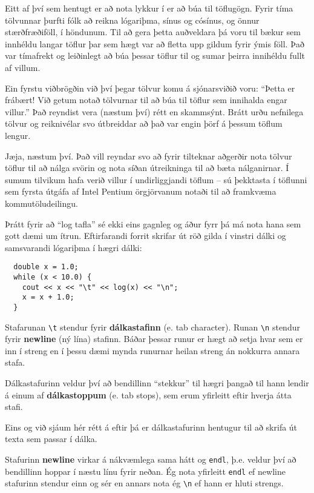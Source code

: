 Eitt af því sem hentugt er að nota lykkur í er að búa til töflugögn.
Fyrir tíma tölvunnar þurfti fólk að reikna lógariþma, sínus og cósínus, og önnur stærðfræðiföll, í höndunum.
Til að gera þetta auðveldara þá voru til bækur sem innhéldu langar töflur þar sem hægt var að fletta upp gildum fyrir ýmis föll.
Það var tímafrekt og leiðinlegt að búa þessar töflur til og sumar þeirra innihéldu fullt af villum.

Ein fyrstu viðbrögðin við því þegar tölvur komu á sjónarsviðið voru:
``Þetta er frábært!  Við getum notað tölvurnar til að búa til töflur sem innihalda engar villur.''
Það reyndist vera (næstum því) rétt en skammsýnt.
Brátt urðu nefnilega tölvur og reiknivélar svo útbreiddar að það var engin þörf á þessum töflum lengur.

Jæja, næstum því.
Það vill reyndar svo að fyrir tilteknar aðgerðir nota tölvur töflur til að nálga svörin og nota síðan útreikninga til að bæta nálganirnar.
Í sumum tilvikum hafa verið villur í undirliggjandi töflum -- sú þekktasta í töflunni sem fyrsta útgáfa af Intel Pentium örgjörvanum notaði til að framkvæma kommutöludeilingu.


Þrátt fyrir að ``log tafla'' sé ekki eins gagnleg og áður fyrr þá má nota hana sem gott dæmi um ítrun.
Eftirfarandi forrit skrifar út röð gilda í vinstri dálki og samsvarandi lógariþma í hægri dálki:

\begin{verbatim}
  double x = 1.0;
  while (x < 10.0) {
    cout << x << "\t" << log(x) << "\n";
    x = x + 1.0;
  }
\end{verbatim}
%
Stafarunan \verb+\t+ stendur fyrir {\bf dálkastafinn} (e. tab character).
Runan \verb+\n+ stendur fyrir {\bf newline} (ný lína) stafinn.
Báðar þessar runur er hægt að setja hvar sem er inn í streng en í þessu dæmi mynda runurnar heilan streng án nokkurra annara stafa.

Dálkastafurinn veldur því að bendillinn ``stekkur'' til hægri þangað til hann lendir á einum af {\bf dálkastoppum} (e. tab stops), sem erum yfirleitt eftir hverja átta stafi.

Eins og við sjáum hér rétt á eftir þá er dálkastafurinn hentugur til að skrifa út texta sem passar í dálka.

Stafurinn {\bf newline} virkar á nákvæmlega sama hátt og {\tt endl}, þ.e. veldur því að bendillinn hoppar í næstu línu fyrir neðan.
Ég nota yfirleitt {\tt endl} ef newline stafurinn stendur einn og sér en annars nota ég \verb+\n+ ef hann er hluti strengs.


